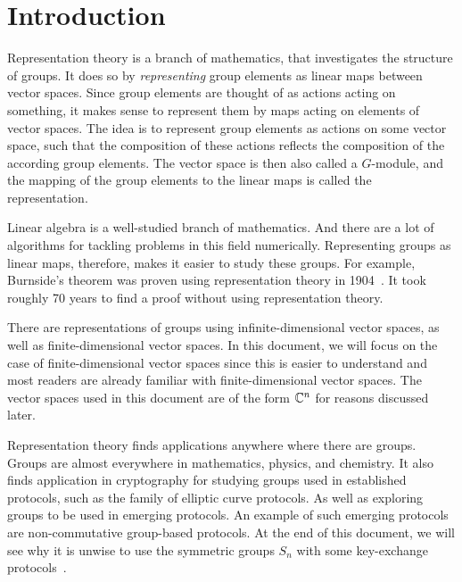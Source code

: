 \section{Introduction}

Representation theory is a branch of mathematics, that investigates the structure of groups.
It does so by \textit{representing} group elements as linear maps between vector spaces.
Since group elements are thought of as actions acting on something, it makes sense to represent them by maps acting on elements of vector spaces.
The idea is to represent group elements as actions on some vector space, such that the composition of these actions reflects the composition of the according group elements.
The vector space is then also called a $G$-module, and the mapping of the group elements to the linear maps is called the representation.

Linear algebra is a well-studied branch of mathematics.
And there are a lot of algorithms for tackling problems in this field numerically.
Representing groups as linear maps, therefore, makes it easier to study these groups.
For example, Burnside's theorem was proven using representation theory in 1904~\cite{burnside1904groups}.
It took roughly 70 years to find a proof without using representation theory.

There are representations of groups using infinite-dimensional vector spaces, as well as finite-dimensional vector spaces.
In this document, we will focus on the case of finite-dimensional vector spaces since this is easier to understand and most readers are already familiar with finite-dimensional vector spaces.
The vector spaces used in this document are of the form $\mathbb{C}^n$ for reasons discussed later.

Representation theory finds applications anywhere where there are groups.
Groups are almost everywhere in mathematics, physics, and chemistry.
It also finds application in cryptography for studying groups used in established protocols, such as the family of elliptic curve protocols.
As well as exploring groups to be used in emerging protocols.
An example of such emerging protocols are non-commutative group-based protocols.
At the end of this document, we will see why it is unwise to use the symmetric groups $S_n$ with some key-exchange protocols~\cite{khovanov2022monoidal}.
